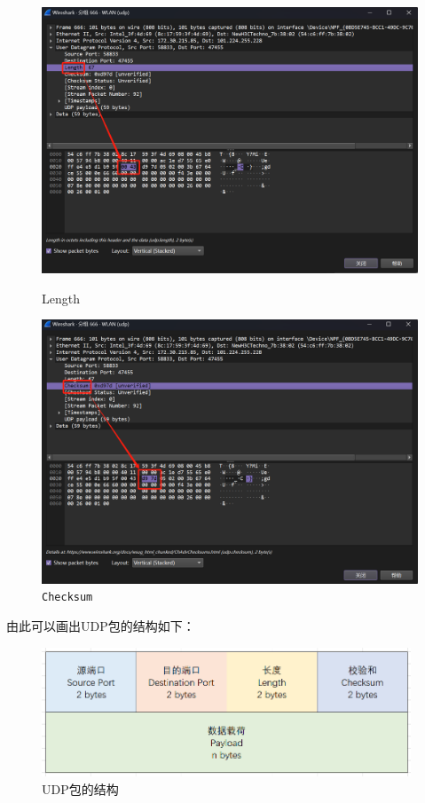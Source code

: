 \documentclass{article}
\begin{document}
	\begin{figure}[H]
		\centering
		\begin{minipage}[b]{0.45\textwidth}
			\includegraphics[width=\textwidth]{images/7.Length.png}
			\caption{Length}
		\end{minipage}
		\hfill
		\begin{minipage}[b]{0.45\textwidth}
			\includegraphics[width=\textwidth]{images/8.Checksum.png}
			\caption{\texttt{Checksum}}
		\end{minipage}
	\end{figure}
	
	由此可以画出UDP包的结构如下：
	
	\begin{figure}[H]
		\centering
		\includegraphics[width=11cm]{images/9.UDP包的结构.png}
		\caption{UDP包的结构}
	\end{figure}
	
\end{document}

